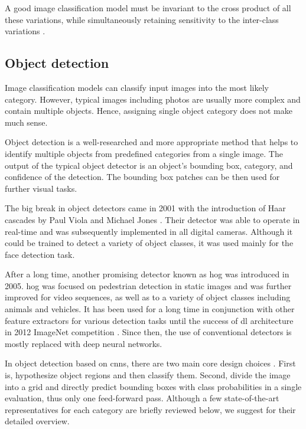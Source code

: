          A good image classification model must be invariant to the cross product of all these variations, while simultaneously retaining sensitivity to the inter-class variations \cite{cs231n}. 
         
    \subsection{Object detection}
        Image classification models can classify input images into the most likely category. However, typical images including photos are usually more complex and contain multiple objects. Hence, assigning single object category does not make much sense.
        
        Object detection \cite{xuobjectdetection, ouaknineobjectdetection} is a well-researched and more appropriate method that helps to identify multiple objects from predefined categories from a single image. The output of the typical object detector is an object's bounding box, category, and confidence of the detection. The bounding box patches can be then used for further visual tasks.
        
        The big break in object detectors came in 2001 with the introduction of Haar cascades by Paul Viola and Michael Jones \cite{viola2001rapid}. Their detector was able to operate in real-time and was subsequently implemented in all digital cameras. Although it could be trained to detect a variety of object classes, it was used mainly for the face detection task. 
        
        After a long time, another promising detector known as \gls{hog} \cite{dalal2005histograms} was introduced in 2005. \gls{hog} was focused on pedestrian detection in static images and was further improved for video sequences, as well as to a variety of object classes including animals and vehicles. It has been used for a long time in conjunction with other feature extractors for various detection tasks until the success of \gls{dl} architecture in 2012 ImageNet competition \cite{russakovsky2015imagenet}. Since then, the use of conventional detectors is mostly replaced with deep neural networks.
        
        In object detection based on \gls{cnn}s, there are two main core design choices \cite{goodfellow2016deep}. First is, hypothesize object regions and then classify them. Second, divide the image into a grid and directly predict bounding boxes with class probabilities in a single evaluation, thus only one feed-forward pass. Although a few state-of-the-art representatives for each category are briefly reviewed below, we suggest \cite{xuobjectdetection, huang2017speed, ouaknineobjectdetection} for their detailed overview.
        
